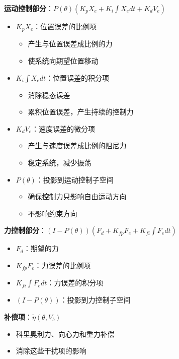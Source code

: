 \documentclass[12pt,a4paper]{article}
\begin{document}
\textbf{运动控制部分}：$P(\theta)(K_p X_e + K_i\int X_e dt + K_d V_e)$

\begin{itemize}
\item \textbf{$K_p X_e$}：位置误差的比例项
\begin{itemize}
\item 产生与位置误差成比例的力
\item 使系统向期望位置移动
\end{itemize}

\item \textbf{$K_i\int X_e dt$}：位置误差的积分项
\begin{itemize}
\item 消除稳态误差
\item 累积位置误差，产生持续的控制力
\end{itemize}

\item \textbf{$K_d V_e$}：速度误差的微分项
\begin{itemize}
\item 产生与速度误差成比例的阻尼力
\item 稳定系统，减少振荡
\end{itemize}

\item \textbf{$P(\theta)$}：投影到运动控制子空间
\begin{itemize}
\item 确保控制力只影响自由运动方向
\item 不影响约束方向
\end{itemize}
\end{itemize}

\textbf{力控制部分}：$(I-P(\theta))(F_d + K_{fp}F_e + K_{fi}\int F_e dt)$

\begin{itemize}
\item \textbf{$F_d$}：期望的力
\item \textbf{$K_{fp}F_e$}：力误差的比例项
\item \textbf{$K_{fi}\int F_e dt$}：力误差的积分项
\item \textbf{$(I-P(\theta))$}：投影到力控制子空间
\end{itemize}

\textbf{补偿项}：$\tilde{\eta}(\theta, V_b)$

\begin{itemize}
\item 科里奥利力、向心力和重力补偿
\item 消除这些干扰项的影响
\end{itemize}
\end{document}
